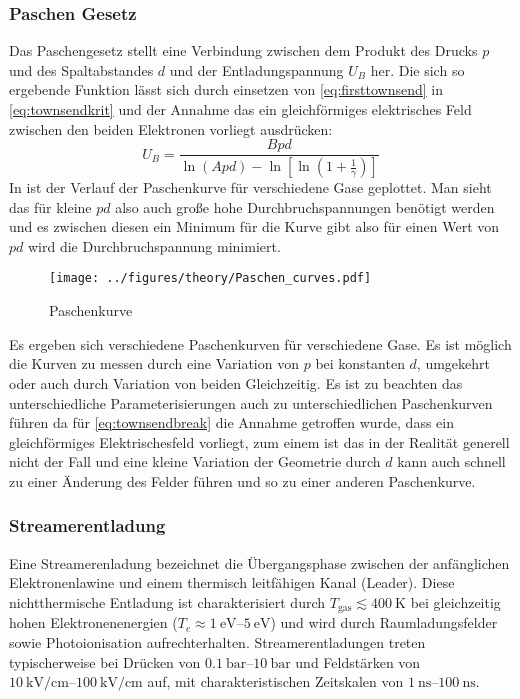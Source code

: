 \subsubsection{Paschen Gesetz}
\label{sec:paschenlaw}
Das Paschengesetz stellt eine Verbindung zwischen dem Produkt des Drucks \(p\) und des Spaltabstandes \(d\) und der Entladungspannung \(U_B\) her. Die sich so ergebende Funktion lässt sich durch einsetzen von \eqref{eq:firsttownsend} in \eqref{eq:townsendkrit} und der Annahme das ein gleichförmiges elektrisches Feld zwischen den beiden Elektronen vorliegt ausdrücken:
\begin{equation}
    U_B = \frac{Bpd}{\ln\left( Apd \right) - \ln\left[ \ln\left(1 + \frac{1}{\gamma} \right) \right]}
    \label{eq:townsendbreak}
\end{equation}
In  ist der Verlauf der Paschenkurve für verschiedene Gase geplottet. Man sieht das für kleine \(pd\) also auch große hohe Durchbruchspannungen benötigt werden und es zwischen diesen ein Minimum für die Kurve gibt also für einen Wert von \(pd\) wird die Durchbruchspannung minimiert.

  \begin{figure}[htbp]
    \centering
    \texttt{[image: ../figures/theory/Paschen\_curves.pdf]}
    \caption{Paschenkurve}
    \label{fig:paschencurve}
  \end{figure}

Es ergeben sich verschiedene Paschenkurven für verschiedene Gase. Es ist möglich die Kurven zu messen durch eine Variation von \(p\) bei konstanten \(d\), umgekehrt oder auch durch Variation von beiden Gleichzeitig. Es ist zu beachten das unterschiedliche Parameterisierungen auch zu unterschiedlichen Paschenkurven führen da für \eqref{eq:townsendbreak} die Annahme getroffen wurde, dass ein gleichförmiges Elektrischesfeld vorliegt, zum einem ist das in der Realität generell nicht der Fall und eine kleine Variation der Geometrie durch \(d\) kann auch schnell zu einer Änderung des Felder führen und so zu einer anderen Paschenkurve. \cite{kuffel2000}


\subsubsection{Streamerentladung}
\label{sec:streamerdischarge}
Eine Streamerenladung bezeichnet die Übergangsphase zwischen der anfänglichen Elektronenlawine und einem thermisch leitfähigen Kanal (Leader).  Diese nichtthermische Entladung ist charakterisiert durch $T_{\text{gas}} \lesssim \SI{400}{\kelvin}$ bei gleichzeitig hohen Elektronenenergien ($T_e \approx \SIrange{1}{5}{\electronvolt}$) und wird durch Raumladungsfelder sowie Photoionisation aufrechterhalten. Streamerentladungen treten typischerweise bei Drücken von $\SIrange{0.1}{10}{\bar}$ und Feldstärken von $\SIrange{10}{100}{\kilo\volt\per\centi\meter}$ auf, mit charakteristischen Zeitskalen von $\SIrange{1}{100}{\nano\second}$.

